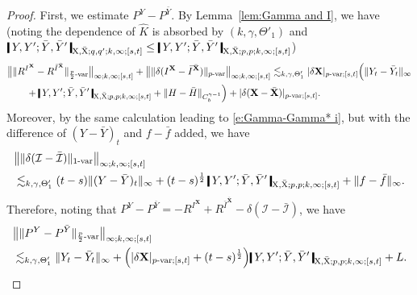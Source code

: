 \documentclass[11pt,reqno]{amsart}
\numberwithin{equation}{section}
\newcommand{\shortthickbar}{%
  \vcenter{\hbox{\rule{1.8pt}{2.2ex}}}%
}
\newcommand{\thicknm}[1]{%
  \mathopen{\shortthickbar}%
  \mkern4mu #1 \mkern4mu%
  \mathclose{\shortthickbar}%
}
\begin{document}
\begin{proof}
First, we estimate $P^{Y} - P^{\bar Y}$. By Lemma~\ref{lem:Gamma and I}, we have (noting the dependence of $\hat K$ is absorbed by $(k,\gamma,\Theta'_1)$ and $\thicknm{Y ,Y'; \bar Y, \bar Y'}_{\mathrm X,\bar{\mathrm X};q,q';k,\infty;[s,t]} \le \thicknm{Y ,Y'; \bar Y, \bar Y'}_{\mathrm X,\bar{\mathrm X};p,p;k,\infty;[s,t]}$)
\begin{equation*}
\begin{aligned}
&\big\| \|R^{I^{\mathbf X}} - R^{\bar I^{\bar {\mathbf X}}}\|_{\frac{p}{2}\text{-}\mathrm{var}} \big\|_{\infty;k,\infty;[s,t]} + \big\| \|\delta(I^{\mathbf X} - \bar I^{\bar{\mathbf X}})\|_{p\text{-}\mathrm{var}} \big\|_{\infty;k,\infty;[s,t]} \lesssim_{k,\gamma,\Theta'_1} |\delta \mathbf X|_{p\text{-}\mathrm{var};[s,t]} \Big(\|Y_t - \bar Y_t\|_{\infty} 
\\ 
& \quad \quad + \thicknm{Y ,Y'; \bar Y, \bar Y'}_{\mathrm X,\bar{\mathrm X};p,p;k,\infty;[s,t]} + \|H - \bar H\|_{C^{\gamma - 1}_{b}}\Big) + |\delta( \mathbf X - \bar{\mathbf X} )|_{p\text{-}\mathrm{var};[s,t]}.
\end{aligned}
\end{equation*}
Moreover, by the same calculation leading to \eqref{e:Gamma-Gamma* i}, but with the difference of $(Y - \bar Y)_t$ and $f - \bar f$ added, we have 
\begin{equation*}	
\begin{aligned}
&\big\| \|\delta(\mathcal I - \bar{\mathcal I}) \|_{1\text{-}\mathrm{var}} \big\|_{\infty;k,\infty;[s,t]} \\ &\lesssim_{k,\gamma,\Theta'_1} (t - s) \|(Y - \bar Y)_t\|_{\infty} + (t - s)^{\frac{1}{2}} \, \thicknm{Y ,Y'; \bar Y, \bar Y'}_{\mathrm X,\bar{\mathrm X};p,p;k,\infty;[s,t]} + \|f - \bar f\|_{\infty}. 
\end{aligned}
\end{equation*}
Therefore, noting that $P^{Y} - P^{\bar Y} = - R^{I^{\mathbf X}} + R^{\bar I^{\bar{\mathbf X}}} - \delta (\mathcal I - \bar{\mathcal I})$, we have 
\begin{equation}\label{e:R  - bar R}
\begin{aligned}
&\big\| \|P^{Y} - P^{\bar Y}\|_{\frac{p}{2}\text{-}\mathrm{var}} \big\|_{\infty;k,\infty;[s,t]}\\ &\lesssim_{k,\gamma,\Theta'_1} \|Y_t - \bar Y_t\|_{\infty} +  \Big(|\delta \mathbf X|_{p\text{-}\mathrm{var};[s,t]} + (t - s)^{\frac{1}{2}}\Big) \thicknm{Y ,Y'; \bar Y, \bar Y'}_{\mathrm X,\bar{\mathrm X};p,p;k,\infty;[s,t]} + L.
\end{aligned}
\end{equation} 


\end{proof}
\end{document}
